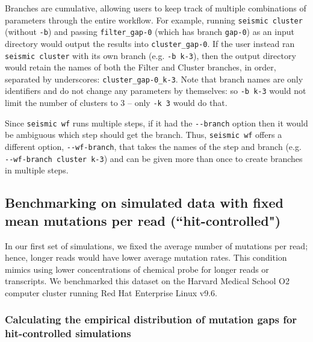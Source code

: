 \documentclass[unnumsec,webpdf,contemporary,large]{oup-authoring-template}%
\theoremstyle{thmstyleone}%
\theoremstyle{thmstyletwo}%
\theoremstyle{thmstylethree}%
\begin{document}
Branches are cumulative, allowing users to keep track of multiple combinations of parameters through the entire workflow.
For example, running \verb|seismic cluster| (without \verb|-b|) and passing \verb|filter_gap-0| (which has branch \verb|gap-0|) as an input directory would output the results into \verb|cluster_gap-0|.
If the user instead ran \verb|seismic cluster| with its own branch (e.g. \verb|-b k-3|), then the output directory would retain the names of both the Filter and Cluster branches, in order, separated by underscores: \verb|cluster_gap-0_k-3|.
Note that branch names are only identifiers and do not change any parameters by themselves: so \verb|-b k-3| would not limit the number of clusters to 3 -- only \verb|-k 3| would do that.

Since \verb|seismic wf| runs multiple steps, if it had the \verb|--branch| option then it would be ambiguous which step should get the branch.
Thus, \verb|seismic wf| offers a different option, \verb|--wf-branch|, that takes the names of the step and branch (e.g. \verb|--wf-branch cluster k-3|) and can be given more than once to create branches in multiple steps.


\subsection{Benchmarking on simulated data with fixed mean mutations per read (``hit-controlled")}

In our first set of simulations, we fixed the average number of mutations per read; hence, longer reads would have lower average mutation rates.
This condition mimics using lower concentrations of chemical probe for longer reads or transcripts.
We benchmarked this dataset on the Harvard Medical School O2 computer cluster running Red Hat Enterprise Linux v9.6.

\subsubsection{Calculating the empirical distribution of mutation gaps for hit-controlled simulations}
\label{empirical-mutation-gap}
\end{document}
